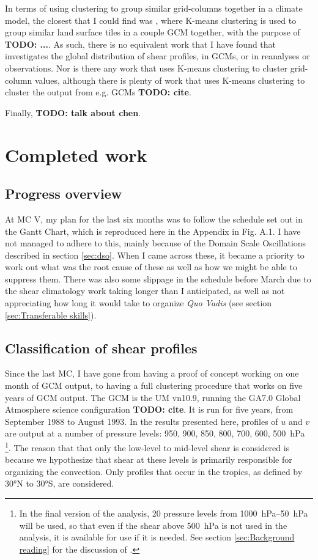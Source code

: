 \documentclass[11pt,a4paper]{article}
\newcommand\todo[1]{\textbf{TODO: #1}}
\begin{document}
In terms of using clustering to group similar grid-columns together in a climate model, the closest that I could find was \cite{hoffman2005using}, where K-means clustering is used to group similar land surface tiles in a couple GCM together, with the purpose of \todo{...}. As such, there is no equivalent work that I have found that investigates the global distribution of shear profiles, in GCMs, or in reanalyses or observations. Nor is there any work that uses K-means clustering to cluster grid-column values, although there is plenty of work that uses K-means clustering to cluster the output from e.g. GCMs \todo{cite}.

Finally, \todo{talk about chen}.

\section{Completed work}
\label{sec:Completed work}


\subsection{Progress overview}
\label{sec:Progress overview}

At MC V, my plan for the last six months was to follow the schedule set out in the Gantt Chart, which is reproduced here in the Appendix in Fig. A.1. I have not managed to adhere to this, mainly because of the Domain Scale Oscillations described in section \ref{sec:dso}. When I came across these, it became a priority to work out what was the root cause of these as well as how we might be able to suppress them. There was also some slippage in the schedule before March due to the shear climatology work taking longer than I anticipated, as well as not appreciating how long it would take to organize \textit{Quo Vadis} (see section \ref{sec:Transferable skills}).


\subsection{Classification of shear profiles}
\label{sec:Classification of shear profiles}
Since the last MC, I have gone from having a proof of concept working on one month of GCM output, to having a full clustering procedure that works on five years of GCM output. The GCM is the UM vn10.9, running the GA7.0 Global Atmosphere science configuration \todo{cite}. It is run for five years, from September 1988 to August 1993. In the results presented here, profiles of $u$ and $v$ are output at a number of pressure levels: \SI{950}{}, \SI{900}{}, \SI{850}{}, \SI{800}{}, \SI{700}{}, \SI{600}{}, \SI{500}{hPa} \footnote{In the final version of the analysis, 20 pressure levels from \SIrange{1000}{50}{hPa} will be used, so that even if the shear above \SI{500}{hPa} is not used in the analysis, it is available for use if it is needed. See section \ref{sec:Background reading} for the discussion of \cite{chen2017}.}. The reason that that only the low-level to mid-level shear is considered is because we hypothesize that shear at these levels is primarily responsible for organizing the convection. Only profiles that occur in the tropics, as defined by 30\si{\degree}N to 30\si{\degree}S, are considered.
\end{document}
